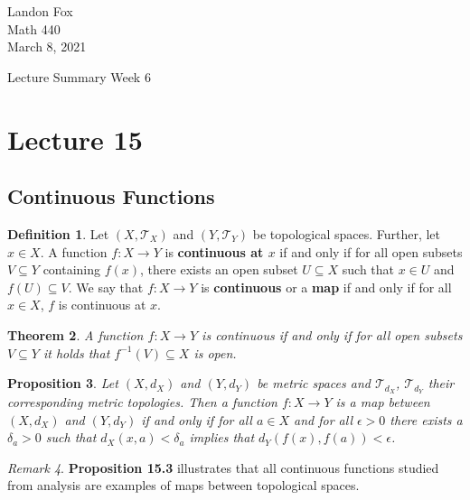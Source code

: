 \documentclass[ 12pt ]{article}
\newcounter{lecture_num}
\theoremstyle{plain}
\theoremstyle{plain}
\newtheorem{theorem}{Theorem}[lecture_num]
\newtheorem{proposition}[theorem]{Proposition}
\theoremstyle{definition}
\newtheorem{definition}[theorem]{Definition}
\theoremstyle{remark}
\newtheorem{remark}[theorem]{Remark}
\begin{document}
\noindent Landon Fox \\
\noindent Math 440 \\
\noindent March 8, 2021

\begin{center}
	\Large Lecture Summary Week 6
\end{center}

\setcounter{lecture_num}{15}
\setcounter{theorem}{0}
\section*{Lecture 15}

\subsection*{Continuous Functions}

\begin{definition}
	Let $(X, \mathcal{T}_X)$ and $(Y, \mathcal{T}_Y)$ be topological spaces. Further, let $x \in X$. A function $f : X \to Y$ is \textbf{continuous at $x$} if and only if for all open
	subsets $V \subseteq Y$ containing $f(x)$, there exists an open subset $U \subseteq X$ such that $x \in U$ and $f(U) \subseteq V$. We say that $f : X \to Y$ is \textbf{continuous} or
	a \textbf{map} if and only if for all $x \in X$, $f$ is continuous at $x$.
\end{definition}

\begin{theorem}
	A function $f : X \to Y$ is continuous if and only if for all open subsets $V \subseteq Y$ it holds that $f^{-1}(V) \subseteq X$ is open.
\end{theorem}

\begin{proposition}
	Let $(X, d_X)$ and $(Y, d_Y)$ be metric spaces and $\mathcal{T}_{d_X}$, $\mathcal{T}_{d_Y}$ their corresponding metric topologies. Then a function $f : X \to Y$ is a map between
	$(X, d_X)$ and $(Y, d_Y)$ if and only if for all $a \in X$ and for all $\epsilon > 0$ there exists a $\delta_a > 0$ such that $d_X(x, a) < \delta_a$ implies that $d_Y\left( f(x),
	f(a) \right) < \epsilon$.
\end{proposition}

\begin{remark}
	\textbf{Proposition 15.3} illustrates that all continuous functions studied from analysis are examples of maps between topological spaces.
\end{remark}
\end{document}
